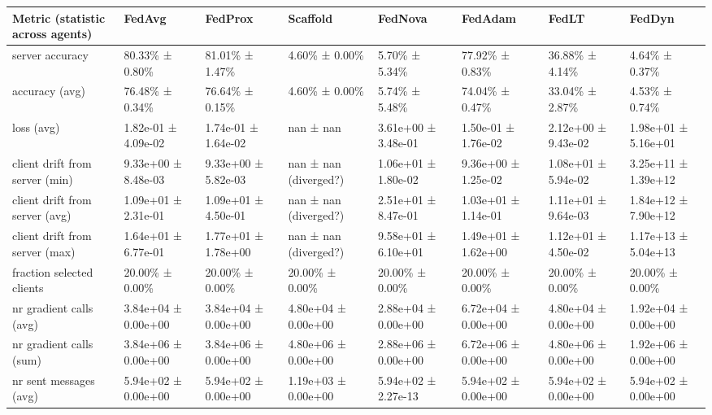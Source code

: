 \begin{tabular}{llllllll}
\hline
 Metric (statistic across agents)   & FedAvg              & FedProx             & Scaffold              & FedNova             & FedAdam             & FedLT               & FedDyn              \\
\hline
 server accuracy                    & 80.33\% ± 0.80\%      & 81.01\% ± 1.47\%      & 4.60\% ± 0.00\%         & 5.70\% ± 5.34\%       & 77.92\% ± 0.83\%      & 36.88\% ± 4.14\%      & 4.64\% ± 0.37\%       \\
 accuracy (avg)                     & 76.48\% ± 0.34\%      & 76.64\% ± 0.15\%      & 4.60\% ± 0.00\%         & 5.74\% ± 5.48\%       & 74.04\% ± 0.47\%      & 33.04\% ± 2.87\%      & 4.53\% ± 0.74\%       \\
 loss (avg)                         & 1.82e-01 ± 4.09e-02 & 1.74e-01 ± 1.64e-02 & nan ± nan             & 3.61e+00 ± 3.48e-01 & 1.50e-01 ± 1.76e-02 & 2.12e+00 ± 9.43e-02 & 1.98e+01 ± 5.16e+01 \\
 client drift from server (min)     & 9.33e+00 ± 8.48e-03 & 9.33e+00 ± 5.82e-03 & nan ± nan (diverged?) & 1.06e+01 ± 1.80e-02 & 9.36e+00 ± 1.25e-02 & 1.08e+01 ± 5.94e-02 & 3.25e+11 ± 1.39e+12 \\
 client drift from server (avg)     & 1.09e+01 ± 2.31e-01 & 1.09e+01 ± 4.50e-01 & nan ± nan (diverged?) & 2.51e+01 ± 8.47e-01 & 1.03e+01 ± 1.14e-01 & 1.11e+01 ± 9.64e-03 & 1.84e+12 ± 7.90e+12 \\
 client drift from server (max)     & 1.64e+01 ± 6.77e-01 & 1.77e+01 ± 1.78e+00 & nan ± nan (diverged?) & 9.58e+01 ± 6.10e+01 & 1.49e+01 ± 1.62e+00 & 1.12e+01 ± 4.50e-02 & 1.17e+13 ± 5.04e+13 \\
 fraction selected clients          & 20.00\% ± 0.00\%      & 20.00\% ± 0.00\%      & 20.00\% ± 0.00\%        & 20.00\% ± 0.00\%      & 20.00\% ± 0.00\%      & 20.00\% ± 0.00\%      & 20.00\% ± 0.00\%      \\
 nr gradient calls (avg)            & 3.84e+04 ± 0.00e+00 & 3.84e+04 ± 0.00e+00 & 4.80e+04 ± 0.00e+00   & 2.88e+04 ± 0.00e+00 & 6.72e+04 ± 0.00e+00 & 4.80e+04 ± 0.00e+00 & 1.92e+04 ± 0.00e+00 \\
 nr gradient calls (sum)            & 3.84e+06 ± 0.00e+00 & 3.84e+06 ± 0.00e+00 & 4.80e+06 ± 0.00e+00   & 2.88e+06 ± 0.00e+00 & 6.72e+06 ± 0.00e+00 & 4.80e+06 ± 0.00e+00 & 1.92e+06 ± 0.00e+00 \\
 nr sent messages (avg)             & 5.94e+02 ± 0.00e+00 & 5.94e+02 ± 0.00e+00 & 1.19e+03 ± 0.00e+00   & 5.94e+02 ± 2.27e-13 & 5.94e+02 ± 0.00e+00 & 5.94e+02 ± 0.00e+00 & 5.94e+02 ± 0.00e+00 \\

\end{tabular}
